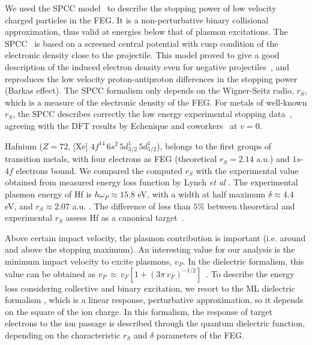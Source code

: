 \documentclass[aps,pra,reprint,groupedaddress,showpacs,showkeys]{revtex4-1}
\begin{document}
We used the SPCC model~\cite{mon17} to describe the stopping power of 
low velocity charged particles in the FEG. It is a non-perturbative 
binary collisional approximation, thus valid at energies below that of 
plasmon excitations.  The SPCC~\cite{mon17} is based on a screened 
central potential with cusp condition of the electronic density close 
to the projectile. This model proved to give a good description of the 
induced electron density even for negative projectiles~\cite{mon17}, 
and reproduces the low velocity proton-antiproton differences in the 
stopping power (Barkas effect). The SPCC formalism only depends on the 
Wigner-Seitz radio, $r_S$, which is a measure of the electronic density 
of the FEG. For metals of well-known $r_S$, the SPCC describes correctly 
the low energy experimental stopping data~\cite{mon17}, agreeing with 
the DFT results by Echenique and coworkers~\cite{eche81,nagy89} at $v=0$. 

Hafnium ($Z=72$, [Xe] $4f^{14}\,6s^2\,5d_{3/2}^1\,5d_{5/2}^1$), belongs 
to the first groups of transition metals, with four electrons as FEG 
(theoretical $r_S=2.14$ a.u.) and $1s$-$4f$ electrons bound. We compared 
the computed $r_S$ with the experimental value obtained from measured 
energy loss function by Lynch \textit{et al} \cite{lynch75}. The 
experimental plasmon energy of Hf is $\hbar\omega_P \approx 15.8$ eV, 
with a width at half maximum $\delta \approx 4.4$ eV, and 
$r_S \approx 2.07$ a.u. \cite{lynch75}. The difference of less than 
$5\%$ between theoretical and experimental $r_S$ assess Hf as a 
canonical target~\cite{mon17}.

Above certain impact velocity, the plasmon contribution is important 
(i.e. around and above the stopping maximum). An interesting value for 
our analysis is the minimum impact velocity to excite plasmons, $v_P$. 
In the dielectric formalism, this value can be obtained as 
$v_P\,\approx\,v_F[1+(3\pi\,v_F)^{-1/2}]$~\cite{suppression}. To 
describe the energy loss considering collective and binary excitation, 
we resort to the ML dielectric formalism \cite{Mermin}, which is a 
linear response, perturbative approximation, so it depends on the 
square of the ion charge. In this formalism, the response of target 
electrons to the ion passage is described through the quantum dielectric 
function, depending on the characteristic $r_S$ and $\delta$ parameters 
of the FEG. 
\end{document}
